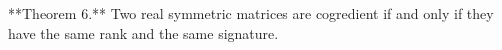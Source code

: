 **Theorem 6.** Two real symmetric matrices are cogredient if and only if they have the same rank and the same signature.
